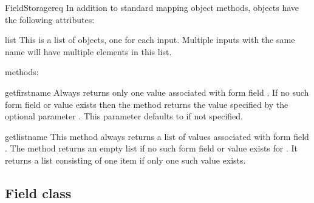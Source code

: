 \begin{classdesc}{FieldStorage}{req}
  In addition to standard mapping object methods,  objects
  have the following attributes:

  \begin{memberdesc}{list}
    This is a list of  objects, one for each input. Multiple
    inputs with the same name will have multiple elements in this list.
  \end{memberdesc}

   methods:

  \begin{methoddesc}[FieldStorage]{getfirst}{name}
    Always returns only one value associated with form field
    . If no such form field or value exists then the method
    returns the value specified by the optional parameter
    . This parameter defaults to  if not
    specified.
  \end{methoddesc}

  \begin{methoddesc}[FieldStorage]{getlist}{name}
    This method always returns a list of values associated with form
    field . The method returns an empty list if no such form
    field or value exists for . It returns a list consisting
    of one item if only one such value exists.
  \end{methoddesc}

\end{classdesc}

\subsection{Field class\label{pyapi-util-fstor-fld}}

